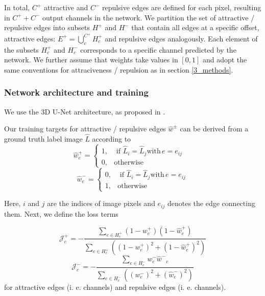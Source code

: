 In total, $C^+$ attractive and $C^-$ repulsive edges are defined for each pixel, resulting in $C^+ + C^-$ output channels in the network. 
We partition the set of attractive / repulsive edges into subsets $H^+$ and $H^-$ that contain all edges at a specific offset, attractive edges:
$\label{edgesets}
    E^+ = {\bigcup_{c}^{C^+}} H^+_{c}$ and repulsive edges analogously. 
Each element of the subsets $H^+_{c}$ and $H^-_{c}$ corresponds to a specific channel predicted by the network. We further assume that weights take values in $[0,1]$ and adopt the same conventions for attraciveness / repulsion as in section \ref{3_methods}. 

\subsubsection*{Network architecture and training}
We use the 3D U-Net \cite{ronneberger_15_u-net,cciccek20163d} architecture, as proposed in \cite{funke2017deep}. %

Our training targets for attractive / repulsive edges $\hat w^\pm$ can be derived from a ground truth label image $\hat L$ according to
\begin{equation}
    \hat w^+_e = \begin{cases}
        1 , &\text{ if } \hat L_i = \hat L_j \textrm{with} \, e = e_{ij} \\
        0 , & \text{otherwise}
    \end{cases}\quad
\end{equation}
\begin{equation}
    \hat w^-_e = \begin{cases}
        0 , &\text{ if } \hat L_i = \hat L_j  \textrm{with} \, e = e_{ij} \\
        1 , & \text{otherwise}
    \end{cases}
\end{equation}

Here, $i$ and $j$ are the indices of image pixels and $e_{ij}$ denotes the edge connecting them.
Next, we define the loss terms

\begin{equation} \label{dice_plus}
    \mathcal{J}^+_{c} = - \frac{\sum_{e \in H^+_{c}} (1 - w^+_e) (1 - \hat w^+_e)}{\sum_{e \in H^+_{c}} ((1 - w^+_e)^2 + (1 -\hat w^+_e)^2)} 
\end{equation}
\begin{equation}
\mathcal{J}^-_{c} = - \frac{\sum_{e \in H^-_{c}} w^-_e {\hat w^-}_e}{\sum_{e \in H^-_{c}} ((w^-_e)^2 + (\hat w^-_e)^2)}
\end{equation}
for attractive edges (i. e. channels) and repulsive edges (i. e. channels).

